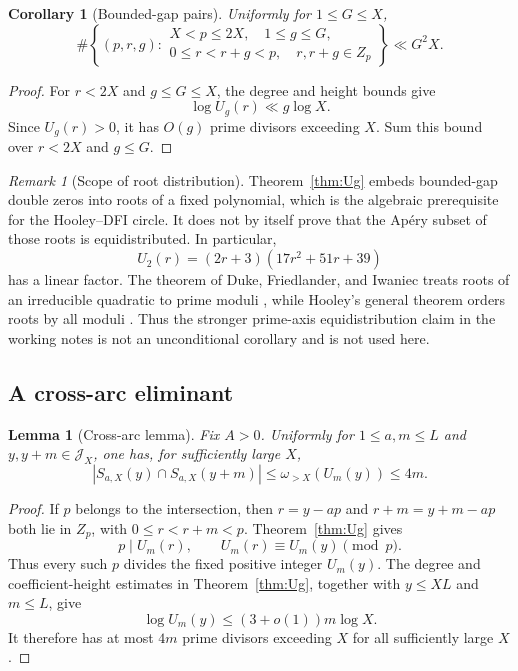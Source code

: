 \documentclass[11pt]{amsart}
\theoremstyle{plain}
\newtheorem{lemma}{Lemma}
\newtheorem{corollary}{Corollary}
\theoremstyle{remark}
\newtheorem{remark}{Remark}
\begin{document}
\begin{corollary}[Bounded-gap pairs]\label{cor:bounded-gap}
Uniformly for $1\leq G\leq X$,
\[
 \#\left\{(p,r,g):
 \begin{array}{l}
 X<p\leq2X,\quad1\leq g\leq G,\\
 0\leq r<r+g<p,\quad r,r+g\in Z_p
 \end{array}\right\}
 \ll G^2X.
\]
\end{corollary}

\begin{proof}
For $r<2X$ and $g\leq G\leq X$, the degree and height bounds give
\[
 \log U_g(r)\ll g\log X.
\]
Since $U_g(r)>0$, it has $O(g)$ prime divisors exceeding $X$.  Sum this
bound over $r<2X$ and $g\leq G$.
\end{proof}

\begin{remark}[Scope of root distribution]
Theorem~\ref{thm:Ug} embeds bounded-gap double zeros into roots of a
fixed polynomial, which is the algebraic prerequisite for the
Hooley--DFI circle.  It does not by itself prove that the Ap\'ery subset
of those roots is equidistributed.  In particular,
\[
 U_2(r)=(2r+3)(17r^2+51r+39)
\]
has a linear factor.  The theorem of Duke, Friedlander, and Iwaniec
treats roots of an irreducible quadratic to prime moduli \cite{DFI1995},
while Hooley's general theorem orders roots by all moduli
\cite{Hooley1964}.  Thus the
stronger prime-axis equidistribution claim in the working notes is not an
unconditional corollary and is not used here.
\end{remark}

\subsection{A cross-arc eliminant}

\begin{lemma}[Cross-arc lemma]\label{lem:cross-arc}
Fix $A>0$.  Uniformly for $1\leq a,m\leq L$ and
$y,y+m\in\mathcal J_X$, one has, for sufficiently large $X$,
\[
 |S_{a,X}(y)\cap S_{a,X}(y+m)|
 \leq\omega_{>X}(U_m(y))\leq4m.
 \tag{7.1}\label{eq:cross-arc}
\]
\end{lemma}

\begin{proof}
If $p$ belongs to the intersection, then
$r=y-ap$ and $r+m=y+m-ap$ both lie in $Z_p$, with
$0\leq r<r+m<p$.  Theorem~\ref{thm:Ug} gives
\[
 p\mid U_m(r),\qquad U_m(r)\equiv U_m(y)\pmod p.
\]
Thus every such $p$ divides the fixed positive integer $U_m(y)$.
The degree and coefficient-height estimates in
Theorem~\ref{thm:Ug}, together with $y\leq XL$ and $m\leq L$, give
\[
 \log U_m(y)\leq(3+o(1))m\log X.
\]
It therefore has at most $4m$ prime divisors exceeding $X$ for all
sufficiently large $X$.
\end{proof}
\end{document}
